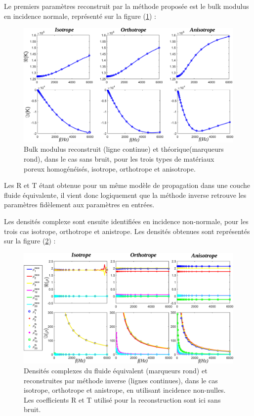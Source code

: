 \documentclass[12pt]{report}
\begin{document}
    Le premiers paramètres reconstruit par la méthode proposée est le bulk modulus en incidence normale, représenté sur la figure (\ref{bulk}) :
    \begin{figure}[ht!]
        \centering
        \includegraphics[scale=0.45]{Bulk.pdf}
        \caption{Bulk modulus reconstruit (ligne continue) et théorique(marqueurs rond), dans le cas sans bruit, pour les trois types de matériaux poreux homogénéisés, isotrope, orthotrope et anisotrope.}
        \label{bulk}
    \end{figure}
    
    Les R et T étant obtenue pour un même modèle de propagation dans une couche fluide équivalente, il vient donc logiquement que la méthode inverse retrouve les paramètres fidèlement aux paramètres en entrées. 
    
    Les densités complexe sont ensuite identifiées en incidence non-normale, pour les trois cas isotrope, orthotrope et anistrope. Les densités obtenues sont représentés sur la figure (\ref{rho_rot}) :
    \begin{figure}[ht!]
        \centering
        \includegraphics[scale=0.45]{Density_rot.pdf}
        \caption{Densités complexes du fluide équivalent (marqueurs rond) et reconstruites par méthode inverse  (lignes continues), dans le cas isotrope, orthotrope et anistrope, en utilisant  incidence non-nulles. Les coefficients R et T utilisé pour la reconstruction sont ici sans bruit.}
        \label{rho_rot}
    \end{figure}
    
\end{document}
